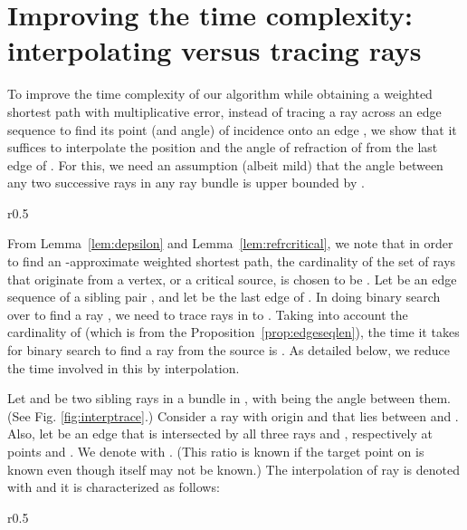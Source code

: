 \documentclass[11pt]{article}
\begin{document}
\section{Improving the time complexity: interpolating versus tracing rays}
\label{sect:interpol}

To improve the time complexity of our algorithm while obtaining a weighted shortest path with  multiplicative error, instead of tracing a ray  across an edge sequence to find its point (and angle) of incidence onto an edge , we show that it suffices to interpolate the position and the angle of refraction of  from the last edge of .
For this, we need an assumption (albeit mild) that the angle between any two successive rays in any ray bundle is upper bounded by .

\begin{wrapfigure}{r}{0.5\textwidth}
\centering
\begin{minipage}[b]{.4\textwidth}
\caption{\footnotesize Illustrating the error in interpolating versus tracing a ray across an edge sequence }
\label{fig:interptrace}
\end{minipage}
\end{wrapfigure}

From Lemma~\ref{lem:depsilon} and Lemma~\ref{lem:refrcritical}, we note that in order to find an -approximate weighted shortest path, the cardinality of the set  of rays that originate from a vertex, or a critical source, is chosen to be .
Let  be an edge sequence of a sibling pair , and let  be the last edge of .
In doing binary search over  to find a ray , we need to trace  rays in  to .
Taking into account the cardinality of  (which is  from the Proposition~\ref{prop:edgeseqlen}), the time it takes for binary search to find a ray from the source is .
As detailed below, we reduce the time involved in this by interpolation. 

Let  and  be two sibling rays in a bundle  in , with  being the angle between them.
(See Fig. \ref{fig:interptrace}.)
Consider a ray  with origin  and that lies between  and .
Also, let  be an edge that is intersected by all three rays  and , respectively at points  and .
We denote  with .
(This ratio is known if the target point  on  is known even though  itself may not be known.)
The interpolation of ray  is denoted with  and it is characterized as follows:

\begin{wrapfigure}{r}{0.5\textwidth}
\centering
\begin{minipage}[b]{.4\textwidth}
\caption{\footnotesize Illustrating the angle of incidence and refraction of rays , and  at an edge }
\label{fig:interpolangles}
\end{minipage}
\end{wrapfigure}
\end{document}
